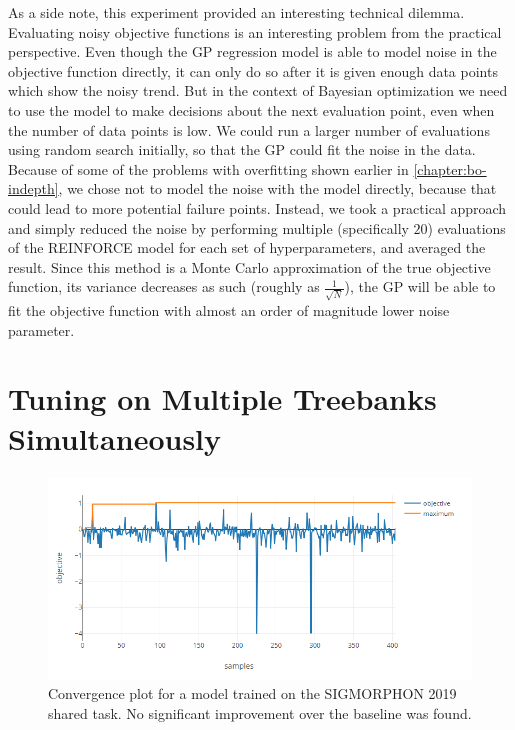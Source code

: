 As a side note, this experiment provided an interesting technical dilemma. Evaluating noisy objective functions is an interesting problem from the practical perspective. Even though the GP regression model is able to model noise in the objective function directly, it can only do so after it is given enough data points which show the noisy trend. But in the context of Bayesian optimization we need to use the model to make decisions about the next evaluation point, even when the number of data points is low. We could run a larger number of evaluations using random search initially, so that the GP could fit the noise in the data. Because of some of the problems with overfitting shown earlier in \autoref{chapter:bo-indepth}, we chose not to model the noise with the model directly, because that could lead to more potential failure points. Instead, we took a practical approach and simply reduced the noise by performing multiple (specifically $20$) evaluations of the REINFORCE model for each set of hyperparameters, and averaged the result. Since this method is a Monte Carlo approximation of the true objective function, its variance decreases as such (roughly as $\frac{1}{\sqrt{N}}$), the GP will be able to fit the objective function with almost an order of magnitude lower noise parameter.


\section{Tuning on Multiple Treebanks Simultaneously}
\label{section:multiple-treebanks-failed}

\begin{figure}
	\begin{center}
		\includegraphics[width=1.0\textwidth]{images/sigmorphon-convergence.png}
		\caption{Convergence plot for a model trained on the SIGMORPHON 2019 shared task. No significant improvement over the baseline was found.}
		\label{figure:sigmorphon-convergence}
	\end{center}
\end{figure}

